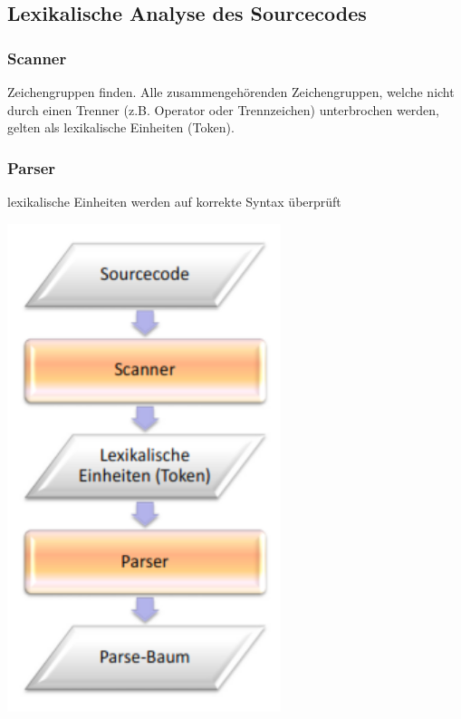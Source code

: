  	\subsection{Lexikalische Analyse des Sourcecodes}
 		\begin{minipage}[c]{10 cm}
 			\subsubsection{Scanner}
 				Zeichengruppen finden. Alle zusammengehörenden
 				Zeichengruppen, welche nicht durch einen Trenner 
 				(z.B. Operator oder Trennzeichen) unterbrochen werden, gelten als lexikalische Einheiten (Token).
 			\vspace*{0.5cm}
 		 	\subsubsection{Parser}
 		 		lexikalische Einheiten werden auf korrekte Syntax überprüft
 		\end{minipage}
 		\hspace*{1cm}
 		\begin{minipage}[c]{4 cm}
 			\includegraphics[width=0.6\textwidth]{pics/Lexikalische_Analyse.png}
 		\end{minipage}
 		
